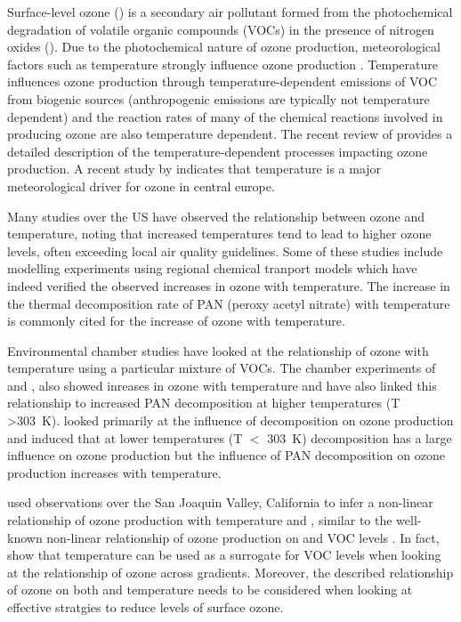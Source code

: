 Surface-level ozone () is a secondary air pollutant formed from the photochemical degradation of volatile organic compounds (VOCs) in the presence of nitrogen oxides ().
Due to the photochemical nature of ozone production, meteorological factors such as temperature strongly influence ozone production \citep{Jacob:2009}.
Temperature influences ozone production through temperature-dependent emissions of VOC from biogenic sources (anthropogenic emissions are typically not temperature dependent) and the reaction rates of many of the chemical reactions involved in producing ozone are also temperature dependent.
The recent review of \citet{Pusede:2015} provides a detailed description of the temperature-dependent processes impacting ozone production.
A recent study by  indicates that temperature is a major meteorological driver for ozone in central europe.

Many studies over the US \citep{Sillman:1995a, Dawson:2007, Pusede:2014} have observed the relationship between ozone and temperature, noting that increased temperatures tend to lead to higher ozone levels, often exceeding local air quality guidelines.
Some of these studies \citep{Sillman:1995a, Dawson:2007} include modelling experiments using regional chemical tranport models which have indeed verified the observed increases in ozone with temperature.
The increase in the thermal decomposition rate of PAN (peroxy acetyl nitrate) with temperature is commonly cited for the increase of ozone with temperature.

Environmental chamber studies have looked at the relationship of ozone with temperature using a particular mixture of VOCs.
The chamber experiments of \citet{Carter:1979} and \citet{Hatakeyama:1991}, also showed inreases in ozone with temperature and have also linked this relationship to increased PAN decomposition at higher temperatures (T \textgreater 303~K).
\citet{Hatakeyama:1991} looked primarily at the influence of  decomposition on ozone production and induced that at lower temperatures (T $<$ 303~K)  decomposition has a large influence on ozone production but the influence of PAN decomposition on ozone production increases with temperature.

\citet{Pusede:2014} used observations over the San Joaquin Valley, California to infer a non-linear relationship of ozone production with temperature and , similar to the well-known non-linear relationship of ozone production on  and VOC levels \citep{Sillman:1999}.
In fact, \citet{Pusede:2014} show that temperature can be used as a surrogate for VOC levels when looking at the relationship of ozone across  gradients.
Moreover, the described relationship of ozone on both  and temperature needs to be considered when looking at effective stratgies to reduce levels of surface ozone.

